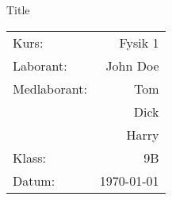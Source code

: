 \documentclass[a4paper]{article}
\begin{document}
\begin{titlepage}%
	\vspace*{\fill}
	\centering
	{\huge Title}
	\vspace{\fill}

	\begin{flushright}
		\begin{tabular}{ lr }
			Kurs: & Fysik 1 \\
			Laborant: & John Doe \\
			Medlaborant: &
			Tom \\
			& Dick \\
			& Harry \\
			Klass: & 9B \\
			Datum: & \today \\
		\end{tabular}
	\end{flushright}
\end{titlepage}%

\newpage%
\tableofcontents
\newpage%
\end{document}
